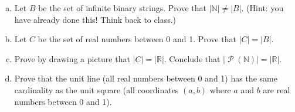 \documentclass[12pt,letterpaper]{article}
\newcommand\N{\mathbb N}
\newcommand\R{\mathbb R}
\newcommand\Pow{\ensuremath{\operatorname{\mathcal{P}}}}
\newenvironment{22enumerate}{\begin{enumerate}[a.]\itemsep0em}{\end{enumerate}}
\newif\ifsol
\newcommand{\solm}[1]{\ifsol \textit{(#1)} \fi}
\begin{document}
      \begin{22enumerate}
        \setcounter{enumi}{4}
      \item Let $B$ be the set of infinite binary strings. Prove that $|\N| \not= |B|$. (Hint: you have already done this! Think back to class.)

      \solm{Think about subsets.}
      \item Let $C$ be the set of real numbers between 0 and 1. Prove that $|C| = |B|$.

      \solm{Nothing special about base 10.}
      \item Prove by drawing a picture that $|C| = |\R|$. Conclude that $|\Pow{(\N)}| = |\R|$.

      \solm{A function with asymptotes at 0 and 1.}
      \item Prove that the unit line (all real numbers between 0 and 1) has the same cardinality as the unit square (all coordinates $(a,b)$ where $a$ and $b$ are real numbers between 0 and 1).

      \solm{Alternating numbers.}
      \end{22enumerate}
\end{document}
